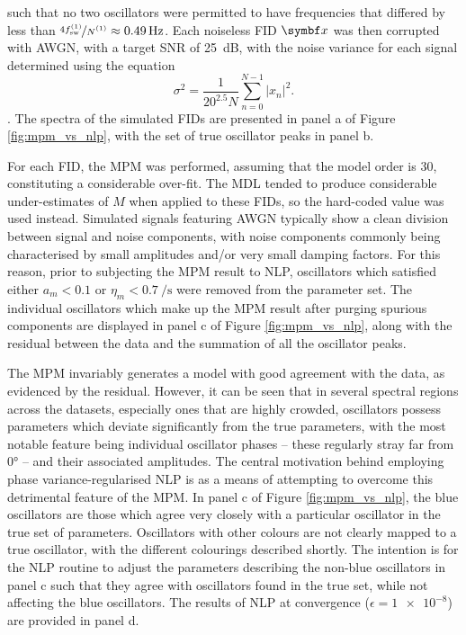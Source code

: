 such that no two oscillators were permitted to have frequencies that differed
by less than $\nicefrac{4 \fswone}{\None} \approx \qty{0.49}{\hertz}$. Each
noiseless \ac{FID} $\bx$ was then corrupted with \ac{AWGN}, with a target
\ac{SNR} of \qty{25}{\deci\bel}, with the noise variance for each signal
determined using the equation
\begin{equation}
    \sigma^2 = \frac{1}{20^{2.5} N}
        \sum_{n=0}^{N-1} \lvert x_n \rvert^2.
\end{equation}
.
The spectra of the simulated
\acp{FID} are presented in panel a of Figure \ref{fig:mpm_vs_nlp}, with the set
of true oscillator peaks in panel b.

For each \ac{FID}, the \ac{MPM} was performed, assuming that the model order is
30, constituting a considerable over-fit. The \ac{MDL} tended to produce
considerable under-estimates of $M$ when applied to these \acp{FID}, so the
hard-coded value was used instead. Simulated signals featuring \ac{AWGN}
typically show a clean division between signal and noise components, with noise
components commonly being characterised by small amplitudes and/or very small
damping factors. For this reason, prior to subjecting the \ac{MPM} result to
\ac{NLP}, oscillators which satisfied either $a_m < 0.1$ or  $\eta_m <
\qty{0.7}{\per\second}$ were removed from the parameter set. The individual
oscillators which make up the \ac{MPM} result after purging spurious components
are displayed in panel c of Figure \ref{fig:mpm_vs_nlp}, along with the
residual between the data and the summation of all the oscillator peaks.

The \ac{MPM} invariably generates a model with good agreement with the data, as
evidenced by the residual.
However, it can be seen that in several spectral regions across the datasets,
especially ones that are highly crowded, oscillators possess parameters which
deviate significantly from the true parameters, with the most notable feature
being individual oscillator phases -- these regularly stray far from \ang{0} --
and their associated amplitudes. The central motivation behind employing phase
variance-regularised \ac{NLP} is as a means of attempting to overcome this
detrimental feature of the \ac{MPM}.
In panel c of Figure \ref{fig:mpm_vs_nlp}, the blue oscillators are those which
agree very closely with a particular oscillator in the true set of parameters.
Oscillators with other colours are not clearly mapped to a true oscillator,
with the different colourings described shortly.
The intention is for the \ac{NLP} routine to adjust the parameters describing
the non-blue oscillators in panel c such that they agree with oscillators found
in the true set, while not affecting the blue oscillators.
The results of \ac{NLP} at convergence ($\epsilon = \num{1e-8}$) are provided
in panel d.

